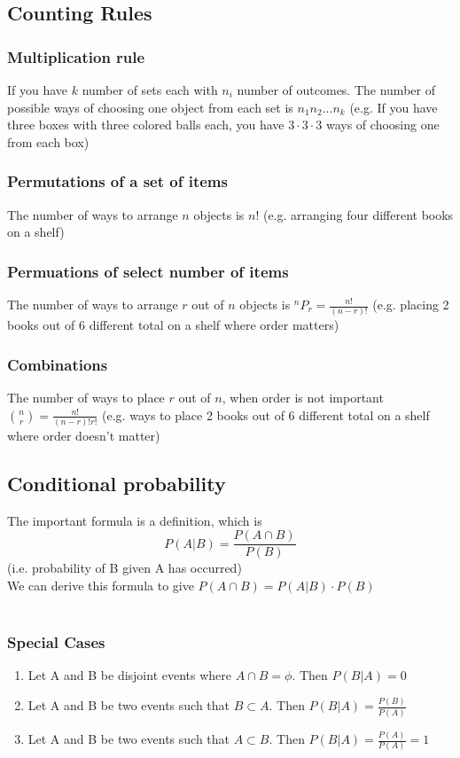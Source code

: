 \documentclass{article}
\begin{document}
\subsection{Counting Rules}
\subsubsection{Multiplication rule} If you have $k$ number of sets each with $n_i$ number of outcomes. The number of possible ways of choosing one object from each set is $n_1n_2...n_k$ (e.g. If you have three boxes with three colored balls each, you have $3\cdot3\cdot3$ ways of choosing one from each box)
\subsubsection{Permutations of a set of items} The number of ways to arrange $n$ objects is $n!$ (e.g. arranging four different books on a shelf)
\subsubsection{Permuations of select number of items} The number of ways to arrange $r$ out of $n$ objects is $^nP_r=\frac{n!}{(n-r)!}$ (e.g. placing 2 books out of 6 different total on a shelf where order matters)
\subsubsection{Combinations} The number of ways to place $r$ out of $n$, when order is not important ${\binom{n}{r}} = {\frac{n!}{(n-r)!r!}}$ (e.g. ways to place 2 books out of 6 different total on a shelf where order doesn't matter)

\subsection{Conditional probability}
The important formula is a definition, which is \[P(A|B) = \frac{P(A\cap B)}{P(B)}\]
(i.e. probability of B given A has occurred)\\
We can derive this formula to give $P(A\cap B)= P(A|B) \cdot P(B)$\\\\
\subsubsection{Special Cases}
\begin{enumerate}
    \item Let A and B be disjoint events where $A\cap B = \phi$. Then $P(B|A) = 0$
    \item Let A and B be two events such that $B\subset A$. Then $P(B|A) = \frac{P(B)}{P(A)}$
    \item Let A and B be two events such that $A\subset B$. Then $P(B|A) = \frac{P(A)}{P(A)} = 1$
\end{enumerate}
\end{document}
